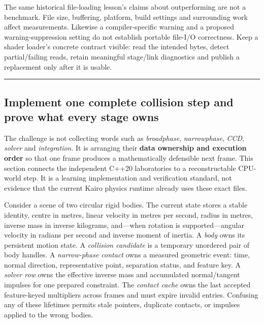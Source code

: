 The same historical file-loading lesson's claims about  outperforming  are not a benchmark. File size, buffering, platform, build settings and surrounding work affect measurements. Likewise a compiler-specific warning and a proposed warning-suppression setting do not establish portable file-I/O correctness. Keep a shader loader's concrete contract visible: read the intended bytes, detect partial/failing reads, retain meaningful stage/link diagnostics and publish a replacement only after it is usable.

\begin{center}\rule{0.5\linewidth}{0.5pt}\end{center}

\subsection{Implement one complete collision step and prove what every stage owns}\label{06-engine-ii-ch046-implement-one-complete-collision-step-and-prove-what-every-stage-owns}

\hypertarget{06-engine-ii-ch046-implement-one-complete-collision-step-and-prove-what-every-stage-owns}{}

The challenge is not collecting words such as \emph{broadphase}, \emph{narrowphase}, \emph{CCD}, \emph{solver} and \emph{integration}. It is arranging their \textbf{data ownership and execution order} so that one frame produces a mathematically defensible next frame. This section connects the independent C++20 laboratories to a reconstructable CPU-world step. It is a learning implementation and verification standard, not evidence that the current Kairo physics runtime already uses these exact files.

Consider a scene of two circular rigid bodies. The current state stores a stable identity, centre in metres, linear velocity in metres per second, radius in metres, inverse mass in inverse kilograms, and---when rotation is supported---angular velocity in radians per second and inverse moment of inertia. A \emph{body} owns its persistent motion state. A \emph{collision candidate} is a temporary unordered pair of body handles. A \emph{narrow-phase contact} owns a measured geometric event: time, normal direction, representative point, separation status, and feature key. A \emph{solver row} owns the effective inverse mass and accumulated normal/tangent impulses for one prepared constraint. The \emph{contact cache} owns the last accepted feature-keyed multipliers across frames and must expire invalid entries. Confusing any of these lifetimes permits stale pointers, duplicate contacts, or impulses applied to the wrong bodies.


